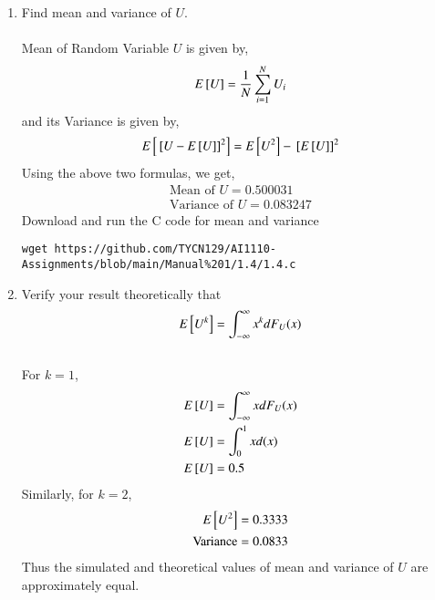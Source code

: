 \documentclass[journal,12pt,twocolumn]{IEEEtran}
\renewcommand\thesection{\arabic{section}}
\begin{document}
\begin{enumerate}[label=\thesection.\arabic*
,ref=\thesection.\theenumi]
\begin{lstlisting}
wget https://github.com/TYCN129/AI1110-Assignments/blob/main/Manual%201/1.3/1.3.py
\end{lstlisting}
\item Find mean and variance of $U$.\\
\solution\\
Mean of Random Variable $U$ is given by,
\begin{equation}
E{}\left[U\right] = \frac{1}{N}\sum_{i=1}^{N}U_i
\end{equation}
and its Variance is given by,
\begin{equation}
E{}\left[{}\left[U - E{}\left[U\right]\right]^2\right] = E{}\left[U^2\right] - {}\left[E{}\left[U\right]\right]^2
\end{equation}
Using the above two formulas, we get,\\
\begin{align}
\text{Mean of } U = 0.500031\\
\text{Variance of } U = 0.083247
\end{align}
Download and run the C code for mean and variance
\begin{lstlisting}
wget https://github.com/TYCN129/AI1110-Assignments/blob/main/Manual%201/1.4/1.4.c
\end{lstlisting}
\item Verify your result theoretically that
\begin{equation}
E{}\left[U^k\right] = \int_{-\infty}^{\infty}x^kdF_{U}(x)
\end{equation}
\solution\\
For $k = 1$,
\begin{align}
E{}\left[U\right] &= \int_{-\infty}^{\infty}xdF_{U}(x)\\
E{}\left[U\right] &= \int_{0}^{1}xd(x)\\
E{}\left[U\right] &= 0.5
\end{align}
Similarly, for $k = 2$,
\begin{align}
E{}\left[U^2\right] &= 0.3333\\
\text{Variance} &= 0.0833
\end{align}
Thus the simulated and theoretical values of mean and variance of $U$ are approximately equal.
\end{enumerate}
\end{document}
